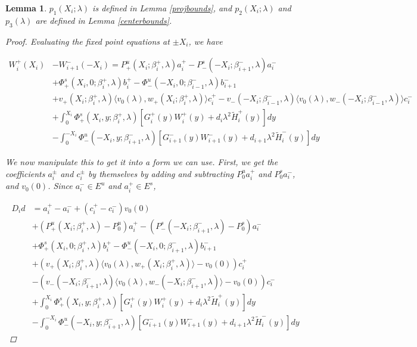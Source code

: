 \documentclass[12pt]{article}
\newtheorem{lemma}{Lemma}
\begin{document}
\begin{lemma}
$p_1(X_i; \lambda)$ is defined in Lemma \ref{projbounds}, and $p_2(X_i; \lambda)$ and $p_3(\lambda)$ are defined in Lemma \ref{centerbounds}. 

\begin{proof}

Evaluating the fixed point equations at $\pm X_i$, we have

\begin{align*}
W_i^+(X_i) &- W_{i+1}^-(-X_i) = P^u_+(X_i; \beta_i^+, \lambda) a_i^+ - P^s_-(-X_i; \beta_{i+1}^-, \lambda) a_i^- \\
&+ \Phi^s_+(X_i, 0; \beta_i^+, \lambda)b_i^+ - \Phi^u_-(-X_i, 0; \beta_{i-1}^-, \lambda)b_{i+1}^- \\
&+ v_+(X_i; \beta_i^+, \lambda) \langle v_0(\lambda), w_+(X_i; \beta_i^+, \lambda) \rangle c_i^+ - v_-(-X_i; \beta_{i-1}^-, \lambda) \langle v_0(\lambda), w_-(-X_i; \beta_{i-1}^-, \lambda) \rangle c_i^- \\
&+ \int_0^{X_i} \Phi^s_+(X_i, y; \beta_i^+, \lambda) [ G_i^+(y) W_i^+(y) + d_i \lambda^2 \tilde{H}_i^+(y) ] dy \\
&- \int_0^{-X_i} \Phi^u_-(-X_i, y; \beta_{i+1}^-, \lambda) [ G_{i+1}^-(y) W_{i+1}^-(y) + d_{i+1} \lambda^2 \tilde{H}_i^-(y) ] dy
\end{align*}

We now manipulate this to get it into a form we can use. First, we get the coefficients $a_i^\pm$ and $c_i^\pm$ by themselves by adding and subtracting $P_0^u a_i^+$ and $P_0^s a_i^-$, and $v_0(0)$. Since $a_i^- \in E^u$ and $a_i^+ \in E^s$, 

\begin{align*}
D_i d &= a_i^+ - a_i^- + (c_i^+ - c_i^-)v_0(0) \\
&+ (P^u_+(X_i; \beta_i^+, \lambda) - P_0^u)a_i^+ - (P^s_-(-X_i; \beta_{i+1}^-, \lambda) - P_0^s)a_i^- \\
&+ \Phi^s_+(X_i, 0; \beta_i^+, \lambda)b_i^+ - \Phi^u_-(-X_i, 0; \beta_{i+1}^-, \lambda)b_{i+1}^- \\
&+ (v_+(X_i; \beta_i^+, \lambda) \langle v_0(\lambda), w_+(X_i; \beta_i^+, \lambda) \rangle - v_0(0) ) c_i^+ \\
&- (v_-(-X_i; \beta_{i+1}^-, \lambda) \langle v_0(\lambda), w_-(-X_i; \beta_{i+1}^-, \lambda) \rangle - v_0(0) ) c_i^- \\
&+ \int_0^{X_i} \Phi^s_+(X_i, y; \beta_i^+, \lambda) [ G_i^+(y) W_i^+(y) + d_i \lambda^2 \tilde{H}_i^+(y) ] dy \\
&- \int_0^{-X_i} \Phi^u_-(-X_i, y; \beta_{i+1}^-, \lambda) [ G_{i+1}^-(y) W_{i+1}^-(y) + d_{i+1} \lambda^2 \tilde{H}_i^-(y) ] dy
\end{align*}


\end{proof}
\end{lemma}
\end{document}
